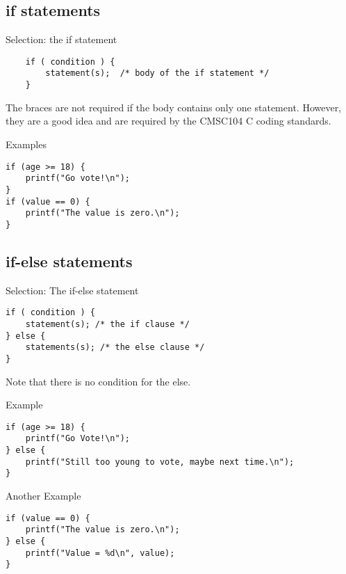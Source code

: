 \documentclass[graphics]{beamer}
\begin{document}
\subsection{if statements}
\begin{frame}[fragile]{Selection: the if statement}
\begin{verbatim}
    if ( condition ) {
        statement(s);  /* body of the if statement */
    }
\end{verbatim}
    The braces are not required if the body contains only one statement. However, they are a good idea and are required by the CMSC104 C coding standards.
\end{frame}

\begin{frame}[fragile]{Examples}
\begin{verbatim}
if (age >= 18) {
    printf("Go vote!\n");
}
if (value == 0) {
    printf("The value is zero.\n");
}
\end{verbatim}
\end{frame}

\subsection{if-else statements}
\begin{frame}[fragile]{Selection: The if-else statement}
\begin{verbatim}
if ( condition ) {
    statement(s); /* the if clause */
} else {
    statements(s); /* the else clause */
}
\end{verbatim}
Note that there is no condition for the else.
\end{frame}

\begin{frame}[fragile]{Example}
\begin{verbatim}
if (age >= 18) {
    printf("Go Vote!\n");
} else {
    printf("Still too young to vote, maybe next time.\n");
}
\end{verbatim}
\end{frame}

\begin{frame}[fragile]{Another Example}
\begin{verbatim}
if (value == 0) {
    printf("The value is zero.\n");
} else {
    printf("Value = %d\n", value);
}
\end{verbatim}
\end{frame}
\end{document}
